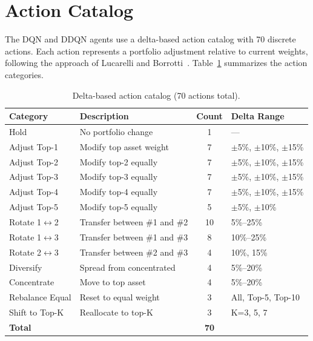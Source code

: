 
\section{Action Catalog}
\label{app:action_catalog}

The DQN and DDQN agents use a delta-based action catalog with 70 discrete actions. Each action represents a portfolio adjustment relative to current weights, following the approach of Lucarelli and Borrotti~\cite{lucarelli2020deep}. Table~\ref{tab:action_catalog} summarizes the action categories.

\begin{table}[htbp]
\centering
\caption{Delta-based action catalog (70 actions total).}
\label{tab:action_catalog}
\begin{tabular}{llcl}
\toprule
\textbf{Category} & \textbf{Description} & \textbf{Count} & \textbf{Delta Range} \\
\midrule
Hold & No portfolio change & 1 & --- \\
Adjust Top-1 & Modify top asset weight & 7 & $\pm$5\%, $\pm$10\%, $\pm$15\% \\
Adjust Top-2 & Modify top-2 equally & 7 & $\pm$5\%, $\pm$10\%, $\pm$15\% \\
Adjust Top-3 & Modify top-3 equally & 7 & $\pm$5\%, $\pm$10\%, $\pm$15\% \\
Adjust Top-4 & Modify top-4 equally & 7 & $\pm$5\%, $\pm$10\%, $\pm$15\% \\
Adjust Top-5 & Modify top-5 equally & 5 & $\pm$5\%, $\pm$10\% \\
Rotate 1$\leftrightarrow$2 & Transfer between \#1 and \#2 & 10 & 5\%--25\% \\
Rotate 1$\leftrightarrow$3 & Transfer between \#1 and \#3 & 8 & 10\%--25\% \\
Rotate 2$\leftrightarrow$3 & Transfer between \#2 and \#3 & 4 & 10\%, 15\% \\
Diversify & Spread from concentrated & 4 & 5\%--20\% \\
Concentrate & Move to top asset & 4 & 5\%--20\% \\
Rebalance Equal & Reset to equal weight & 3 & All, Top-5, Top-10 \\
Shift to Top-K & Reallocate to top-K & 3 & K=3, 5, 7 \\
\midrule
\textbf{Total} & & \textbf{70} & \\
\bottomrule
\end{tabular}
\end{table}


